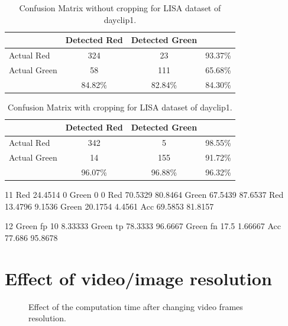 \begin{table}[h!]
  \centering
  \caption{Confusion Matrix without cropping for LISA dataset of dayclip1.}
  \label{t:con_nocrp}
  \begin{tabular}{  l | c | c | r }
   
     & Detected Red & Detected Green &  \\
    \hline
    Actual Red & 324 & 23 & 93.37\% \\
    \hline
    Actual Green & 58 & 111 & 65.68\% \\
    \hline
    & 84.82\% & 82.84\% & 84.30\% \\
    
  \end{tabular}
\end{table}

\begin{table}[h!]
  \centering
  \caption{Confusion Matrix with cropping for LISA dataset of dayclip1.}
  \label{t:con_crp}
  \begin{tabular}{  l | c | c | r }
   
     & Detected Red & Detected Green &  \\
    \hline
    Actual Red & 342 & 5 & 98.55\% \\
    \hline
    Actual Green & 14 & 155 & 91.72\% \\
    \hline
    & 96.07\% & 96.88\% & 96.32\% \\
    
  \end{tabular}
\end{table}
11
Red 24.4514 0
Green 0 0
Red 70.5329 80.8464
Green 67.5439 87.6537
Red 13.4796 9.1536
Green 20.1754 4.4561
Acc 69.5853 81.8157

12
Green fp 10 8.33333
Green tp 78.3333 96.6667
Green fn 17.5 1.66667
Acc 77.686 95.8678


\section{Effect of video/image resolution}


\begin{figure}[h!]
  \centering
  \vspace{2in}
  \caption{Effect of the computation time after changing video frames resolution.}
  \label{f:vf_res}
\end{figure}

